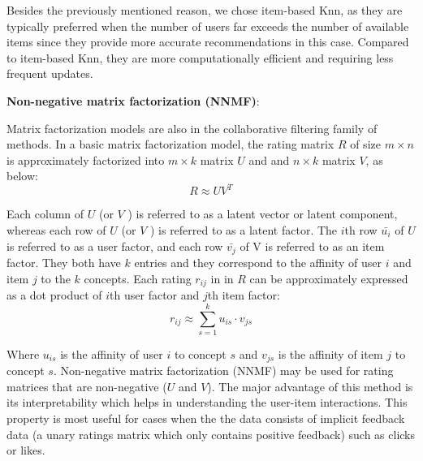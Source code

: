         
        Besides the previously mentioned reason, we chose item-based Knn, as they are typically preferred when the number of users far exceeds the number of available items since they provide more accurate recommendations in this case. Compared to item-based Knn, they are more computationally efficient and requiring less frequent updates.

       
        \textbf{Non-negative matrix factorization (NNMF)}:
       
       Matrix factorization models \cite{koren20009mf} are also in the collaborative filtering family of methods. In a basic matrix factorization model, the rating matrix $R$ of size $m\times n$ is approximately factorized into $m\times k$ matrix $U$ and and $n\times k$ matrix $V$, as below:
       \begin{equation}
           R\approx UV^T
       \end{equation}
       
       Each column of $U$ (or $V$ ) is referred to as a latent vector or latent component, whereas each row of $U$ (or $V$ ) is referred to as a latent factor. The $i$th row $\bar{u_i}$ of $U$ is referred to as a user factor, and each row $\bar{v_j}$ of V is referred to as an item factor. They both have $k$ entries and they correspond to the affinity of user $i$ and item $j$ to the $k$ concepts.
       Each rating $r_{ij}$ in in $R$ can be approximately expressed as a dot product of $i$th user factor and $j$th item factor:
       \begin{equation}
           r_{ij} \approx \sum_{s=1}^{k} u_{is} \cdot v_{js}
       \end{equation}
       
       Where $u_{is}$ is the affinity of user $i$ to concept $s$ and $v_{js}$ is the affinity of item $j$ to concept $s$. 
       Non-negative matrix factorization (NNMF) \cite{lee2001algorithms,zhang2006learning} may be used for rating matrices that are non-negative ($U$ and $V$). The major advantage of this method is its interpretability which helps in understanding the user-item interactions. This property is most useful for cases when the the data consists of implicit feedback data (a unary ratings matrix which only contains positive feedback) such as clicks or likes.
       
